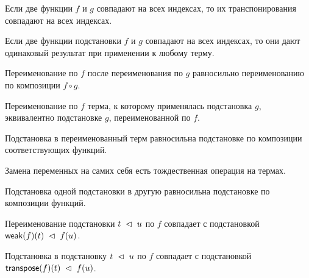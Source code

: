\begin{lemma}
Если две функции $f$ и $g$ совпадают на всех индексах,
то их транспонирования совпадают на всех индексах.
\end{lemma}

\begin{lemma}
Если две функции подстановки $f$ и $g$ совпадают на
всех индексах, то они дают одинаковый результат при
применении к любому терму.
\end{lemma}

\begin{lemma}
Переименование по $f$ после переименования по $g$
равносильно переименованию по композиции $f \circ g$.
\end{lemma}

\begin{lemma}
Переименование по $f$ терма, к которому применялась
подстановка $g$, эквивалентно подстановке $g$,
переименованной по $f$.
\end{lemma}

\begin{lemma}
Подстановка в переименованный терм равносильна
подстановке по композиции соответствующих функций.
\end{lemma}

\begin{lemma}
Замена переменных на самих себя есть тождественная
операция на термах.
\end{lemma}

\begin{lemma}
Подстановка одной подстановки в другую равносильна
подстановке по композиции функций.
\end{lemma}

\begin{lemma}
Переименование подстановки $t\;\vartriangleleft\;u$ по $f$
совпадает с подстановкой $\mathsf{weak}(f)(t)\;\vartriangleleft\;f(u)$.
\end{lemma}

\begin{lemma}
Подстановка в подстановку $t\;\vartriangleleft\;u$ по $f$
совпадает с подстановкой
$\mathsf{transpose}(f)(t)\;\vartriangleleft\;f(u)$.
\end{lemma}

